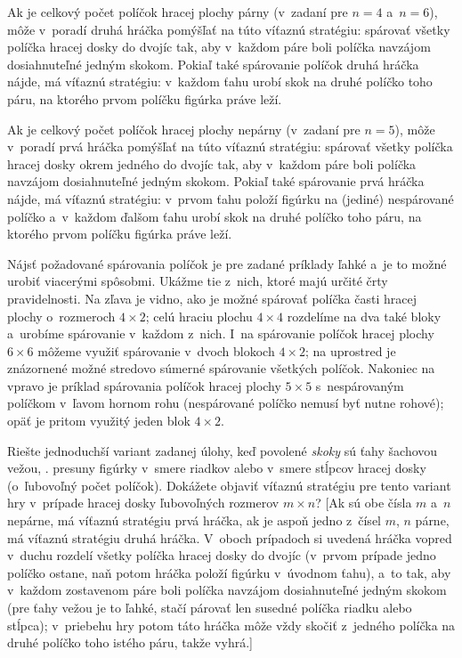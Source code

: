 {%
Ak je celkový počet políčok hracej plochy párny
(v~zadaní pre $n=4$ a~$n=6$), môže v~poradí druhá
hráčka pomýšľať na túto víťaznú stratégiu: spárovať všetky
políčka hracej dosky do dvojíc tak, aby v~každom páre boli políčka
navzájom dosiahnuteľné jedným skokom. Pokiaľ také spárovanie políčok
druhá hráčka nájde, má víťaznú stratégiu: v~každom ťahu urobí
skok na druhé políčko toho páru, na ktorého prvom políčku figúrka práve leží.

Ak je celkový počet políčok hracej plochy nepárny (v~zadaní
pre $n=5$), môže v~poradí prvá hráčka pomýšľať na túto
víťaznú stratégiu: spárovať všetky políčka hracej dosky okrem
jedného do dvojíc tak, aby v~každom páre boli políčka
navzájom dosiahnuteľné jedným skokom. Pokiaľ také spárovanie prvá
hráčka nájde, má víťaznú stratégiu: v~prvom ťahu položí figúrku
na (jediné) nespárované políčko a~v~každom ďalšom ťahu urobí skok
na druhé políčko toho páru, na ktorého prvom políčku figúrka práve leží.

Nájsť požadované spárovania políčok je pre zadané príklady ľahké
a~je to možné urobiť viacerými spôsobmi. Ukážme tie z~nich, ktoré majú
určité črty pravidelnosti. Na \obr{} zľava je vidno, ako je
možné spárovať políčka časti hracej plochy o~rozmeroch $4\times2$; celú
hraciu plochu $4\times4$ rozdelíme na dva také bloky a~urobíme
spárovanie v~každom z~nich. I~na
spárovanie políčok hracej plochy $6\times6$ môžeme využiť spárovanie v~dvoch
blokoch $4\times2$; na  uprostred je znázornené
možné stredovo súmerné spárovanie všetkých políčok. Nakoniec na  vpravo
je príklad spárovania políčok hracej plochy $5\times5$ s~nespárovaným
políčkom v~ľavom hornom rohu (nespárované políčko nemusí byť nutne rohové);
opäť je pritom využitý jeden blok
$4\times 2$.
%

Riešte jednoduchší variant zadanej úlohy,
keď povolené {\it skoky\/} sú ťahy šachovou vežou, \tj. presuny
figúrky v~smere riadkov alebo v~smere stĺpcov hracej dosky
(o~ľubovoľný počet políčok). Dokážete objaviť víťaznú stratégiu pre
tento variant hry v~prípade hracej dosky ľubovoľných rozmerov $m\times n$?
[Ak sú obe čísla $m$ a~$n$ nepárne, má víťaznú stratégiu prvá
hráčka, ak je aspoň jedno z~čísel $m$, $n$ párne,
má víťaznú stratégiu druhá hráčka. V~oboch prípadoch si uvedená
hráčka vopred v~duchu rozdelí
všetky políčka hracej dosky do dvojíc (v~prvom prípade jedno políčko ostane,
naň potom hráčka položí figúrku v~úvodnom ťahu), a~to tak,
aby v~každom zostavenom páre boli políčka navzájom dosiahnuteľné
jedným skokom (pre ťahy vežou je to ľahké, stačí párovať len susedné
políčka riadku alebo stĺpca); v~priebehu hry potom táto hráčka môže vždy
skočiť z~jedného políčka na druhé políčko toho istého páru, takže vyhrá.]

}
